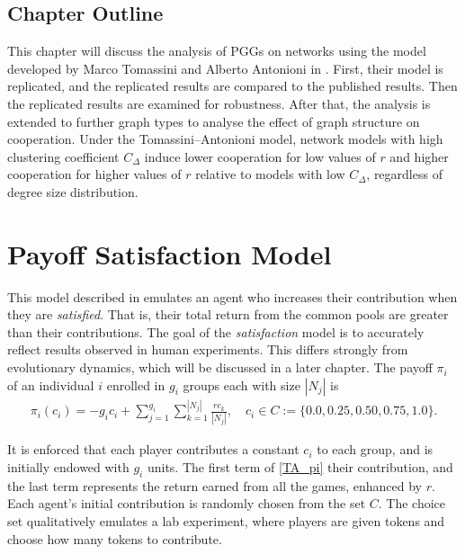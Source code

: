 

\subsection{Chapter Outline}
This chapter will discuss the analysis of PGGs on networks using the model developed by Marco Tomassini and Alberto Antonioni in \cite{RN49}. First, their model is replicated, and the replicated results are compared to the published results. Then the replicated results are examined for robustness. After that, the analysis is extended to further graph types to analyse the effect of graph structure on cooperation. Under the Tomassini--Antonioni model, network models with high clustering coefficient $C_\Delta$ induce lower cooperation for low values of $r$ and higher cooperation for higher values of $r$ relative to models with low $C_\Delta$, regardless of degree size distribution. \\

\section{Payoff Satisfaction Model}
This model described in \cite{RN49} emulates an agent who increases their contribution when they are \emph{satisfied}. That is, their total return from the common pools are greater than their contributions. The goal of the \emph{satisfaction} model is to accurately reflect results observed in human experiments. This differs strongly from evolutionary dynamics, which will be discussed in a later chapter. The payoff $\pi_i$ of an individual $i$ enrolled in $g_i$ groups each with size $|N_j|$ is \\
\begin{align} \label{TA_pi}
    \pi_i(c_i) = - g_ic_i + \sum_{j=1}^{g_i} \sum_{k=1}^{|N_j|} \frac{rc_k}{|N_j|}, \quad c_i \in C:= \{0.0, 0.25, 0.50, 0.75, 1.0\}. 
\end{align}

It is enforced that each player contributes a constant $c_i$ to each group, and is initially endowed with $g_i$ units. The first term of \eqref{TA_pi} their contribution, and the last term represents the return earned from all the games, enhanced by $r$. \\

Each agent's initial contribution is randomly chosen from the set $C$. The choice set qualitatively emulates a lab experiment, where players are given tokens and choose how many tokens to contribute. \\

